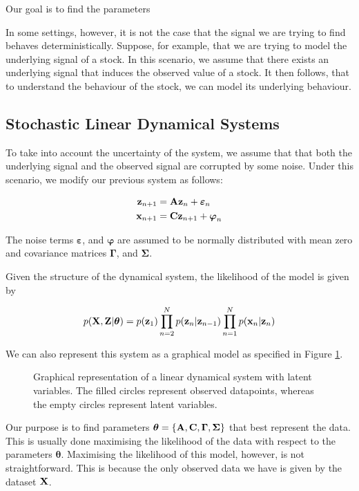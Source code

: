 \documentclass[11pt]{article}
\begin{document}
Our goal is to find the parameters 

In some settings, however, it is not the case that the signal we are trying to find behaves deterministically. Suppose, for example, that we are trying to model the underlying signal of a stock. In this scenario, we assume that there exists an underlying signal that induces the observed value of a stock. It then follows, that to understand the behaviour of the stock, we can model its underlying behaviour.

\subsection{Stochastic Linear Dynamical Systems}

To take into account the uncertainty of the system, we assume that that both the underlying signal and the observed signal are corrupted by some noise. Under this scenario, we modify our previous system as follows:
 

\begin{align*}
	{\bf z}_{n+1} &= {\bf A} {\bf z}_{n} + \boldsymbol\varepsilon_n\\
	{\bf x}_{n+1} &= {\bf C} {\bf z}_{n+1} + \boldsymbol\varphi_n
\end{align*}

The noise terms $\boldsymbol{\varepsilon}$, and $\boldsymbol{\varphi}$ are assumed to be normally distributed with mean zero and covariance matrices $\boldsymbol{\Gamma}$, and $\boldsymbol{\Sigma}$.

Given the structure of the dynamical system, the likelihood of the model is given by

\begin{equation}
	p({\bf X}, {\bf Z}\vert\boldsymbol\theta) = p({\bf z}_1)\prod_{n=2}^N p({\bf z}_n\vert {\bf z}_{n-1})\prod_{n=1}^N p({\bf x}_n\vert {\bf z}_n)
\end{equation}

We can also represent this system as a graphical model as specified in Figure \ref{fig:lds-gm}.

\begin{figure}
	\centering
	
	\caption{Graphical representation of a linear dynamical system with latent variables. The filled circles represent observed datapoints, whereas the empty circles represent latent variables.}
	\label{fig:lds-gm}
\end{figure}



Our purpose is to find parameters $\boldsymbol\theta = \{{\bf A}, {\bf C}, \boldsymbol\Gamma, \boldsymbol\Sigma\}$ that best represent the data. This is usually done maximising the likelihood of the data with respect to the parameters $\boldsymbol{\theta}$. Maximising the likelihood of this model, however, is not straightforward. This is because the only observed data we have is given by the dataset $\bf X$. %
\end{document}
